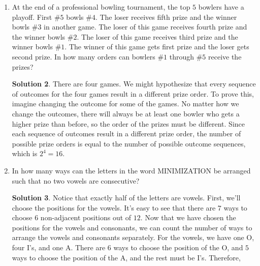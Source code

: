 \documentclass{article}
\theoremstyle{definition}
\newtheorem*{solution}{Solution}
\begin{document}
\begin{multicols}{2}
\begin{enumerate}
\begin{solution}
                letters are unique is $2! \cdot 2! = 4$ times the number of 
                arrangements that we want to count. Therefore, there are 
                $\frac{8!}{4} = 10080$ ways to arrange the letters SEANCHEN.
            \end{solution}
        \item At the end of a professional bowling tournament, the top $5$ bowlers 
            have a playoff. First \#$5$ bowls \#$4$. The loser receives fifth prize 
            and the winner bowls \#$3$ in another game. The loser of this game 
            receives fourth prize and the winner bowls \#$2$. The loser of this game 
            receives third prize and the winner bowls \#$1$. The winner of this game 
            gets first prize and the loser gets second prize. In how many orders can 
            bowlers \#$1$ through \#$5$ receive the prizes?
            \begin{solution}
                There are four games. We might hypothesize that every sequence of 
                outcomes for the four games result in a different prize order. To 
                prove this, imagine changing the outcome for some of the games. No 
                matter how we change the outcomes, there will always be at least one 
                bowler who gets a higher prize than before, so the order of the 
                prizes must be different. Since each sequence of outcomes result in 
                a different prize order, the number of possible prize orders is 
                equal to the number of possible outcome sequences, which is $2^4 = 
                16$.
            \end{solution}
        \item In how many ways can the letters in the word MINIMIZATION be arranged 
            such that no two vowels are consecutive?
            \begin{solution}
                Notice that exactly half of the letters are vowels. First, we'll 
                choose the positions for the vowels. It's easy to see that there are 
                $7$ ways to choose $6$ non-adjacent positions out of $12$. Now that 
                we have chosen the positions for the vowels and consonants, we can 
                count the number of ways to arrange the vowels and consonants 
                separately. For the vowels, we have one O, four I's, and one A. 
                There are $6$ ways to choose the position of the O, and $5$ ways to 
                choose the position of the A, and the rest must be I's. Therefore, 

\end{solution}
\end{enumerate}
\end{multicols}
\end{document}
